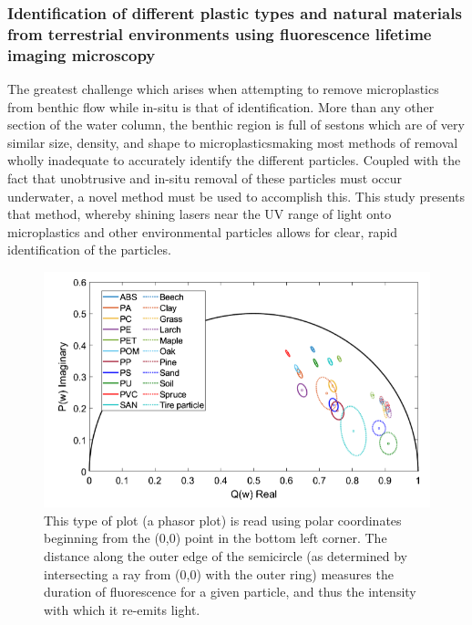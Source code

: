 \documentclass[fleqn,10pt]{SelfArx} %
\begin{document}
	\subsubsection*{ Identification of different plastic types and natural materials from terrestrial environments using fluorescence lifetime imaging microscopy}
	The greatest challenge which arises when attempting to remove microplastics from \gls{benthic} flow while in-situ is that of identification. More than any other section of the water column, the \gls{benthic} region is full of \glspl{seston} which are of very similar size, density, and shape to microplastics\textemdash making most methods of removal wholly inadequate to accurately identify the different particles. Coupled with the fact that unobtrusive and in-situ removal of these particles must occur underwater, a novel method must be used to accomplish this. This study presents that method, whereby shining lasers near the UV range of light onto microplastics and other environmental particles allows for clear, rapid identification of the particles.
	\begin{figure}[h]
		\centering
		\includegraphics[width=1\linewidth]{Figures/Phasor.png}
		\caption[Phasor Plot \textemdash MPs and Organics]{This type of plot (a phasor plot) is read using polar coordinates beginning from the (0,0) point in the bottom left corner. The distance along the outer edge of the semicircle (as determined by intersecting a ray from (0,0) with the outer ring) measures the duration of fluorescence for a given particle, and thus the intensity with which it re-emits light.}
		\label{fig:Phasor}
	\end{figure}
\end{document}

